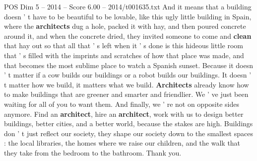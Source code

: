 \begin{textsample}{POS Dim 5 – 2014 – Score 6.00 – 2014/t001635.txt}
And it means that a building doesn ' t have to be beautiful to be lovable, like this ugly little building in Spain, where the \textbf{architects} dug a hole, packed it with hay, and then poured concrete around it, and when the concrete dried, they invited someone to come and \textbf{clean} that hay out so that all that ' s left when it ' s done is this hideous little room that ' s filled with the imprints and scratches of how that place was made, and that becomes the most sublime place to watch a Spanish sunset.
Because it doesn ' t matter if a cow builds our buildings or a robot builds our buildings.
It doesn ' t matter how we build, it matters what we build. \textbf{Architects} already know how to make buildings that are greener and smarter and friendlier.
We ' ve just been waiting for all of you to want them.
And finally, we ' re not on opposite sides anymore.
Find an \textbf{architect}, hire an \textbf{architect}, work with us to design better buildings, better cities, and a better world, because the stakes are high.
Buildings don ' t just reflect our society, they shape our society down to the smallest spaces : the local libraries, the homes where we raise our children, and the walk that they take from the bedroom to the bathroom.
Thank you.

\end{textsample}
